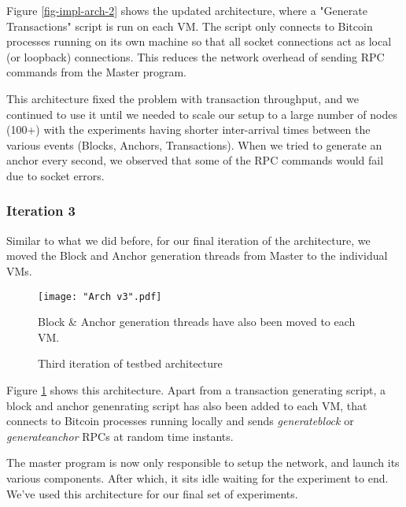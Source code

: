 Figure \ref{fig-impl-arch-2} shows the updated architecture, where a "Generate Transactions" script is run on each VM. The script only connects to Bitcoin processes running on its own machine so that all socket connections act as local (or loopback) connections. This reduces the network overhead of sending RPC commands from the Master program. 

This architecture fixed the problem with transaction throughput, and we continued to use it until we needed to scale our setup to a large number of nodes (100+) with the experiments having shorter inter-arrival times between the various events (Blocks, Anchors, Transactions). When we tried to generate an anchor every second, we observed that some of the RPC commands would fail due to socket errors.


\subsubsection{Iteration 3} \label{impl-arch-3}

Similar to what we did before, for our final iteration of the architecture, we moved the Block and Anchor generation threads from Master to the individual VMs.

\begin{figure}[!htb]
    \centering
    \texttt{[image: "Arch v3".pdf]}
    \caption{Third iteration of testbed architecture}
    
    \medskip
    \footnotesize
    Block \& Anchor generation threads have also been moved to each VM.
    \label{fig-impl-arch-3}
\end{figure}

Figure \ref{fig-impl-arch-3} shows this architecture. Apart from a transaction generating script, a block and anchor genenrating script has also been added to each VM, that connects to Bitcoin processes running locally and sends \textit{generateblock} or \textit{generateanchor} RPCs at random time instants.

The master program is now only responsible to setup the network, and launch its various components. After which, it sits idle waiting for the experiment to end. We've used this architecture for our final set of experiments.


